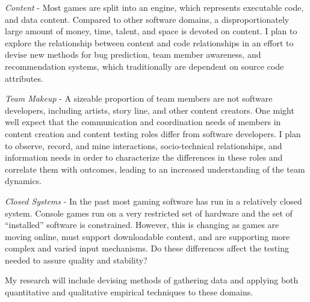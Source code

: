 \documentclass[9pt]{article}
\newenvironment{packed_enum}{%
\vspace{-4pt}
\begin{enumerate}
  \setlength{\itemsep}{1pt}
  \setlength{\parskip}{0pt}
  \setlength{\parsep}{0pt}
}{\end{enumerate}
\vspace{-4pt}%
}
\begin{document}
\begin{small}
\begin{packed_enum}

\item \emph{Content} - 
%
    Most games are split into an engine, which represents executable code, and
    data content. Compared to other software domains, a disproportionately
    large amount of money, time, talent, and space is devoted on content.
    I plan to explore the relationship between content and code
    relationships in an effort to devise new methods for bug prediction, team
    member awareness, and recommendation systems, which traditionally are
    dependent on source code attributes.

\item \emph{Team Makeup} - 
%
    A sizeable proportion of team members are not software developers,
    including artists, story line, and other content creators.  One might well
    expect that the communication and coordination needs of members in content
    creation and content testing roles differ from software developers.  I plan
    to observe, record, and mine interactions, socio-technical relationships,
    and information needs in order to characterize the differences in these
    roles and correlate them with outcomes, leading to an increased
    understanding of the team dynamics.

\item \emph{Closed Systems} -
%
    In the past most gaming software has run in a relatively closed system.
    Console games run on a very restricted set of hardware and the set of
    ``installed'' software is constrained.  However, this is changing as games
    are moving online, must support downloadable content, and are supporting
    more complex and varied input mechanisms.  Do these differences affect the
    testing needed to assure quality and stability?  

\end{packed_enum}

My research will include devising methods of gathering data
and applying both quantitative and qualitative empirical techniques 
to these domains.

\end{small}
\end{document}
